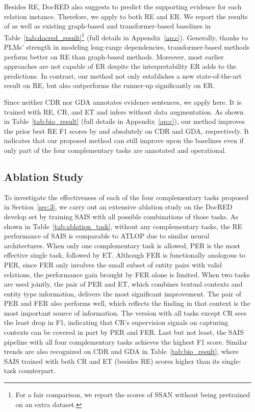 Besides RE, DocRED also suggests to predict the supporting evidence for each relation instance.
Therefore, we apply  to both RE and ER.
We report the results of  as well as existing graph-based and transformer-based baselines in Table~\ref{tab:docred_result}\footnote{For a fair comparison, we report the scores of SSAN \cite{xu2021entity} without being pretrained on an extra dataset.} (full details in Appendix~\ref{ap:c}).
Generally, thanks to PLMs' strength in modeling long-range dependencies, transformer-based methods perform better on RE than graph-based methods.
Moreover, most earlier approaches are not capable of ER despite the interpretability ER adds to the predictions.
In contrast, our  method not only establishes a new state-of-the-art result on RE, but also outperforms the runner-up significantly on ER. 

Since neither CDR nor GDA annotates evidence sentences, we apply  here.
It is trained with RE, CR, and ET and infers without data augmentation.
As shown in Table~\ref{tab:bio_result} (full details in Appendix~\ref{ap:c}), our method improves the prior best RE F1 scores by  and  absolutely on CDR and GDA, respectively.
It indicates that our proposed method can still improve upon the baselines even if only part of the four complementary tasks are annotated and operational.


\subsection{Ablation Study} \label{sec:5.3}

To investigate the effectiveness of each of the four complementary tasks proposed in Section~\ref{sec:3}, we carry out an extensive ablation study on the DocRED develop set by training SAIS with all possible combinations of those tasks.
As shown in Table~\ref{tab:ablation_task}, without any complementary tasks, the RE performance of SAIS is comparable to ATLOP \cite{zhou2021document} due to similar neural architectures.
When only one complementary task is allowed, PER is the most effective single task, followed by ET.
Although FER is functionally analogous to PER, since FER only involves the small subset of entity pairs with valid relations, the performance gain brought by FER alone is limited.
When two tasks are used jointly, the pair of PER and ET, which combines textual contexts and entity type information, delivers the most significant improvement.
The pair of PER and FER also performs well, which reflects the finding in \cite{peng2020learning} that context is the most important source of information.
The version with all tasks except CR sees the least drop in F1, indicating that CR's supervision signals on capturing contexts can be covered in part by PER and FER.
Last but not least, the SAIS pipeline with all four complementary tasks achieves the highest F1 score.
Similar trends are also recognized on CDR and GDA in Table~\ref{tab:bio_result}, where SAIS trained with both CR and ET (besides RE) scores higher than its single-task counterpart.

